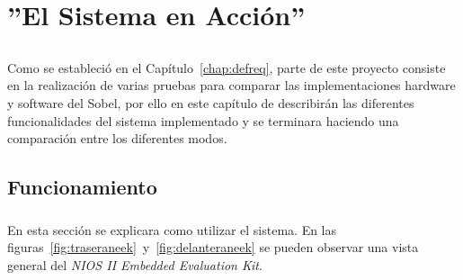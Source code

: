 \documentclass[a4paper,12pt,titlepage,final]{book}
\begin{document}
\chapter{''El Sistema en Acción''}
\section*{}
\subsection*{}
\subsubsection*{}

\paragraph{}
Como se estableció en el Capítulo~\ref{chap:defreq}, parte de este proyecto consiste en la realización de varias pruebas para comparar las implementaciones hardware y software del Sobel, por ello en este capítulo de describirán las diferentes funcionalidades del sistema implementado y se terminara haciendo una comparación entre los diferentes modos.

\clearpage
\section{Funcionamiento}
\subsection*{}
\subsubsection*{}
\paragraph{}
En esta sección se explicara como utilizar el sistema. En las figuras~\ref{fig:traseraneek}~y~\ref{fig:delanteraneek} se pueden observar una vista general del \textit{NIOS II Embedded Evaluation Kit}.
\end{document}
